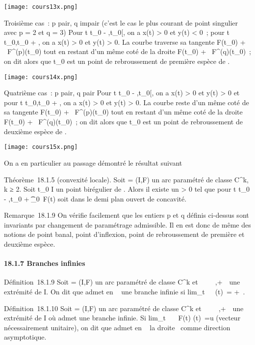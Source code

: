 \documentclass[]{article}
\begin{document}
\text\texttt{[image: cours13x.png]}

Troisième cas~: p pair, q impair (c'est le cas le plus courant de point
singulier avec p = 2 et q = 3) Pour t \in{]}t_0 -
\eta,t_0{[}, on a x(t) \textgreater{} 0 et y(t) \textless{} 0~;
pour t \in{]}t_0,t_0 + \eta{[}, on a x(t) \textgreater{} 0
et y(t) \textgreater{} 0. La courbe traverse sa tangente F(t_0)
+ ~F^(p)(t_0) tout en restant d'un même coté de la
droite F(t_0) + ~F^(q)(t_0)~; on dit alors
que t_0 est un point de rebroussement de première espèce de \Gamma.

\text\texttt{[image: cours14x.png]}

Quatrième cas~: p pair, q pair Pour t \in{]}t_0 -
\eta,t_0{[}, on a x(t) \textgreater{} 0 et y(t) \textgreater{} 0
et pour t \in{]}t_0,t_0 + \eta{[}, on a x(t) \textgreater{}
0 et y(t) \textgreater{} 0. La courbe reste d'un même coté de sa
tangente F(t_0) + ~F^(p)(t_0) tout en
restant d'un même coté de la droite F(t_0) +
~F^(q)(t_0)~; on dit alors que t_0 est un
point de rebroussement de deuxième espèce de \Gamma.

\text\texttt{[image: cours15x.png]}

On a en particulier au passage démontré le résultat suivant

Théorème~18.1.5 (convexité locale). Soit \Gamma = (I,F) un arc paramétré de
classe C^k, k ≥ 2. Soit t_0 \in I un point birégulier
de \Gamma. Alors il existe un \eta \textgreater{} 0 tel que pour t
\in{]}t_0 - \eta,t_0 +
\eta{[}\diagdown\t_0\, F(t) soit dans le
demi plan ouvert de concavité.

Remarque~18.1.9 On vérifie facilement que les entiers p et q définis
ci-dessus sont invariants par changement de paramétrage admissible. Il
en est donc de même des notions de point banal, point d'inflexion, point
de rebroussement de première et deuxième espèce.

\paragraph{18.1.7 Branches infinies}

Définition~18.1.9 Soit \Gamma = (I,F) un arc paramétré de classe
C^k et \alpha~ \in {}~ \cup\-\infty~,+\infty~\ une
extrémité de I. On dit que \Gamma admet en \alpha~ une branche infinie si
lim_t\rightarrow~\alpha~~\F(t)\
= +\infty~.

Définition~18.1.10 Soit \Gamma = (I,F) un arc paramétré de classe
C^k et \alpha~ \in \mathbb{R}~ \cup\-\infty~,+\infty~\ une
extrémité de I où \Gamma admet une branche infinie. Si
lim_t\rightarrow~\alpha~~ F(t) \over
\F(t)\
=\vec u (vecteur nécessairement unitaire), on dit que
\Gamma admet en \alpha~ la droite ~\vecu comme direction
asymptotique.
\end{document}
